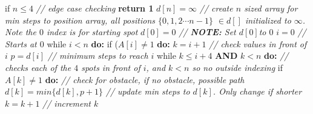 \documentclass{article}
\begin{document}
 if $n \leq 4$ \textit{ // edge case checking } \newline 
\indent \textbf{return 1} \newline 
 $d[n]= \infty$ \textit{// create $n$ sized array for min steps to position array, all positions $\{0,1, 2 \cdots n-1 \}$ $\in d[]$ initialized to $\infty$. Note the $0$ index is for starting spot} \newline\newline
 $d[0]=0$ \textit{// \textbf{NOTE:} Set  $d[0]$to $0$} \newline
 $i=0$ \textit{// Starts at $0$} \newline
 while $i <n$ \textbf{do:} \newline
 \indent if ($A[i] \neq 1$ \textbf{do:} \newline
 \indent\indent $k=i+1$ \textit{// check values in front of $i$} \newline
 \indent\indent $p=d[i]$ \textit{// minimum steps to reach $i$} \newline 
\indent \indent  while $k\leq i+4$ \textbf{AND} $k < n$ \textbf{do:} \newline  
\indent \indent \indent \textit{// checks each of the $4$ spots in front of $i$, and $k < n$ so no outside indexing} \newline
 \indent\indent \indent if $A[k] \neq 1$ \textbf{do:} \textit{// check for obstacle, if no obstacle, possible path} \newline
\indent  \indent \indent \indent \indent $d[k] = min\{d[k],p+1\}$ \textit{// update min steps to $d[k]$. Only change if shorter} \newline \newline 
\indent \indent \indent $k=k+1$ \textit{ // increment $k$} \newline \newline 
\end{document}
